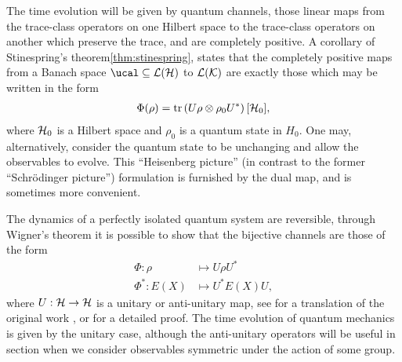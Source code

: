 The time evolution will be given by quantum channels, those linear maps from the trace-class operators on one Hilbert space to the trace-class operators on another which preserve the trace, and are completely positive. A corollary of Stinespring's theorem\ref{thm:stinespring}, states that the completely positive maps from a Banach space $\ucal\subseteq\bops[\hcal]$ to $\bops[\mathcal{K}]$ are exactly those which may be written in the form
\begin{align}
  \Phi(\rho) = \operatorname{tr}\left( U \rho\otimes\rho_0 U^* \right)[\mathcal{H}_0],
\end{align}
where $\mathcal{H}_0$ is a Hilbert space and $\rho_0$ is a quantum state in $H_0$. One may, alternatively, consider the quantum state to be unchanging and allow the observables to evolve. This ``Heisenberg picture'' (in contrast to the former ``Schr\"odinger picture'') formulation is furnished by the dual map, and is sometimes more convenient.

The dynamics of a perfectly isolated quantum system are reversible, through Wigner's theorem it is possible to show that the bijective channels are those of the form
\begin{align}
  \Phi:\rho&\mapsto U\rho U^*\\
  \Phi^*:E(X)&\mapsto U^* E(X) U,
\end{align}
where $U:\mathcal{H}\to\mathcal{H}$ is a unitary or anti-unitary map, see \cite{wigner1960} for a translation of the original work \cite{wigner1931}, or \cite{bargmann1964-wigner} for a detailed proof. The time evolution of quantum mechanics is given by the unitary case, although the anti-unitary operators will be useful in section  when we consider observables symmetric under the action of some group.


